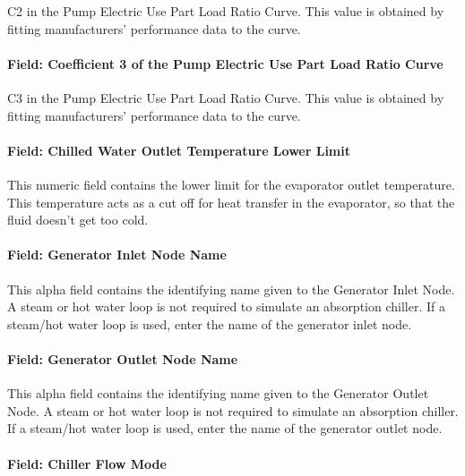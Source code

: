 C2 in the Pump Electric Use Part Load Ratio Curve. This value is obtained by fitting manufacturers' performance data to the curve.

\paragraph{Field: Coefficient 3 of the Pump Electric Use Part Load Ratio Curve}\label{field-coefficient-3-of-the-pump-electric-use-part-load-ratio-curve}

C3 in the Pump Electric Use Part Load Ratio Curve. This value is obtained by fitting manufacturers' performance data to the curve.

\paragraph{Field: Chilled Water Outlet Temperature Lower Limit}\label{field-chilled-water-outlet-temperature-lower-limit}

This numeric field contains the lower limit for the evaporator outlet temperature. This temperature acts as a cut off for heat transfer in the evaporator, so that the fluid doesn't get too cold.

\paragraph{Field: Generator Inlet Node Name}\label{field-generator-inlet-node-name}

This alpha field contains the identifying name given to the Generator Inlet Node. A steam or hot water loop is not required to simulate an absorption chiller. If a steam/hot water loop is used, enter the name of the generator inlet node.

\paragraph{Field: Generator Outlet Node Name}\label{field-generator-outlet-node-name}

This alpha field contains the identifying name given to the Generator Outlet Node. A steam or hot water loop is not required to simulate an absorption chiller. If a steam/hot water loop is used, enter the name of the generator outlet node.

\paragraph{Field: Chiller Flow Mode}\label{field-chiller-flow-mode}

